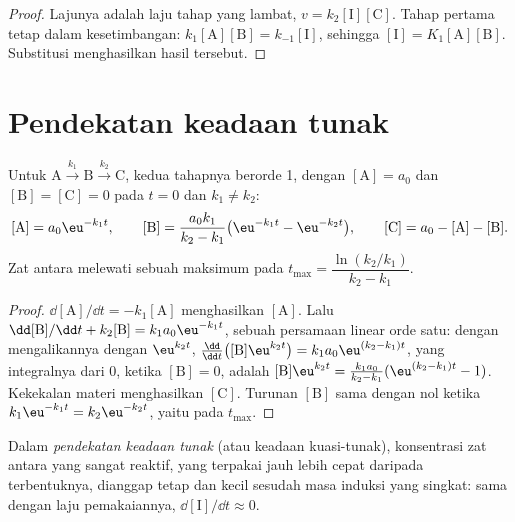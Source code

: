 \begin{proof}
Lajunya adalah laju tahap yang lambat, $v = k_2[\mathrm{I}][\mathrm{C}]$.
Tahap pertama tetap dalam kesetimbangan: $k_1[\mathrm{A}][\mathrm{B}] =
k_{-1}[\mathrm{I}]$, sehingga $[\mathrm{I}] = K_1[\mathrm{A}][\mathrm{B}]$.
Substitusi menghasilkan hasil tersebut.
\end{proof}

\section{Pendekatan keadaan tunak}

\begin{theorem}\label{thm:b1:elementary-steps:consecutive}
Untuk $\mathrm{A} \xrightarrow{k_1} \mathrm{B} \xrightarrow{k_2} \mathrm{C}$,
kedua tahapnya berorde 1, dengan $[\mathrm{A}] = a_0$ dan $[\mathrm{B}] =
[\mathrm{C}] = 0$ pada $t = 0$ dan $k_1 \ne k_2$:
\[
  [\mathrm{A}] = a_0\eu^{-k_1t}, \qquad
  [\mathrm{B}] = \frac{a_0k_1}{k_2 - k_1}\big(\eu^{-k_1t} - \eu^{-k_2t}\big),
  \qquad [\mathrm{C}] = a_0 - [\mathrm{A}] - [\mathrm{B}] .
\]
Zat antara melewati sebuah maksimum pada $t_{\max} = \dfrac{\ln(k_2/k_1)}
{k_2 - k_1}$.
\end{theorem}

\begin{proof}
$\dd[\mathrm{A}]/\dd t = -k_1[\mathrm{A}]$ menghasilkan $[\mathrm{A}]$. Lalu
$\dd[\mathrm{B}]/\dd t + k_2[\mathrm{B}] = k_1a_0\eu^{-k_1t}$, sebuah
persamaan linear orde satu: dengan mengalikannya dengan $\eu^{k_2t}$, $\frac{\dd}{\dd t}
\big([\mathrm{B}]\eu^{k_2t}\big) = k_1a_0\eu^{(k_2-k_1)t}$, yang
integralnya dari 0, ketika $[\mathrm{B}] = 0$, adalah $[\mathrm{B}]\eu^{k_2t} =
\frac{k_1a_0}{k_2-k_1}(\eu^{(k_2-k_1)t} - 1)$. Kekekalan materi menghasilkan
$[\mathrm{C}]$. Turunan $[\mathrm{B}]$ sama dengan nol ketika $k_1\eu^{-k_1t}
= k_2\eu^{-k_2t}$, yaitu pada $t_{\max}$.
\end{proof}

\begin{definition}\label{def:b1:elementary-steps:qssa}
Dalam \emph{pendekatan keadaan tunak}
(atau keadaan kuasi-tunak), konsentrasi zat antara yang sangat reaktif,
yang terpakai jauh lebih cepat daripada terbentuknya, dianggap tetap dan
kecil sesudah masa induksi yang singkat:  sama dengan
laju pemakaiannya,
$\dd[\mathrm{I}]/\dd t \approx 0$.
\end{definition}

